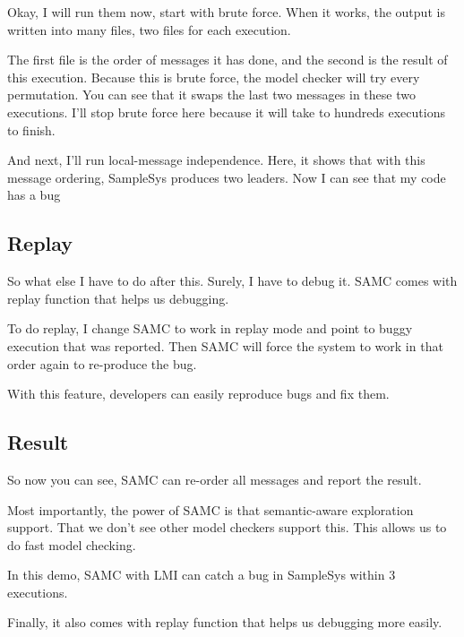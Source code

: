 Okay, I will run them now, start with brute force. When it works, the output is
written into many files, two files for each execution. 

The first file is the order of messages it has done, and the second is the
result of this execution. Because this is brute force, the model checker will
try every permutation. You can see that it swaps the last two messages in these
two executions. I'll stop brute force here because it will take to hundreds
executions to finish.

And next, I'll run local-message independence. Here, it shows that with this
message ordering, SampleSys produces two leaders. Now I can see that my code has
a bug

\subsection{Replay}

So what else I have to do after this. Surely, I have to debug it. SAMC comes
with replay function that helps us debugging. 

To do replay, I change SAMC to work in replay mode and point to buggy execution
that was reported. Then SAMC will force the system to work in that order again
to re-produce the bug.

With this feature, developers can easily reproduce bugs and fix them.

\subsection{Result}

So now you can see, SAMC can re-order all messages and report the result.

Most importantly, the power of SAMC is that semantic-aware exploration support.
That we don't see other model checkers support this. This allows us to do fast
model checking.

In this demo, SAMC with LMI can catch a bug in SampleSys within 3 executions.

Finally, it also comes with replay function that helps us debugging more easily.

